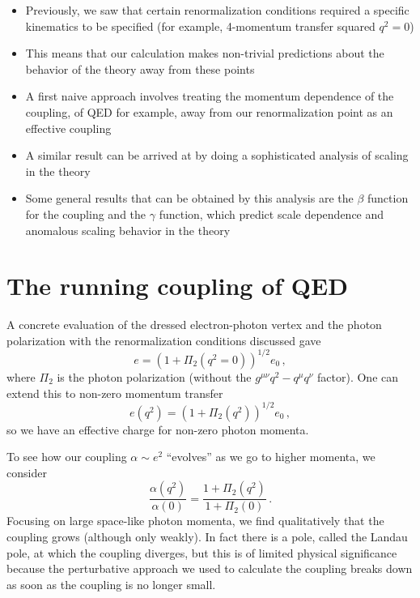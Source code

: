 \documentclass[12pt]{memoir}
\begin{document}
\begin{itemize}
  \item Previously, we saw that certain renormalization conditions required a specific kinematics to be specified
    (for example, 4-momentum transfer squared $q^2=0$)
  \item This means that our calculation makes non-trivial predictions about the behavior of the theory away from these points
  \item A first naive approach involves treating the momentum dependence of the coupling,
    of QED for example,
    away from our renormalization point as an effective coupling
  \item A similar result can be arrived at by doing a sophisticated analysis of scaling in the theory
  \item Some general results that can be obtained by this analysis are the $\beta$ function for the coupling
    and the $\gamma$ function,
    which predict scale dependence and anomalous scaling behavior in the theory
\end{itemize}

\section{The running coupling of QED}

A concrete evaluation of the dressed electron-photon vertex and the photon polarization
with the renormalization conditions discussed gave
\begin{equation}
  e = (1 + \Pi_2(q^2=0))^{1/2}e_0\,,
\end{equation}
where $\Pi_2$ is the photon polarization (without the $g^{\mu\nu}q^2 - q^{\mu}q^{\nu}$ factor).
One can extend this to non-zero momentum transfer
\begin{equation}
  e(q^2) = (1 + \Pi_2(q^2))^{1/2}e_0\,,
\end{equation}
so we have an effective charge for non-zero photon momenta.

To see how our coupling $\alpha \sim e^2$ ``evolves'' as we go to higher momenta, we consider
\begin{equation}
  \frac{\alpha(q^2)}{\alpha(0)} = \frac{1 + \Pi_2(q^2)}{1 + \Pi_2(0)}\,.
\end{equation}
Focusing on large space-like photon momenta,
we find qualitatively that the coupling grows (although only weakly).
In fact there is a pole, called the Landau pole, at which the coupling diverges,
but this is of limited physical significance
because the perturbative approach we used to calculate the coupling
breaks down as soon as the coupling is no longer small.
\end{document}

